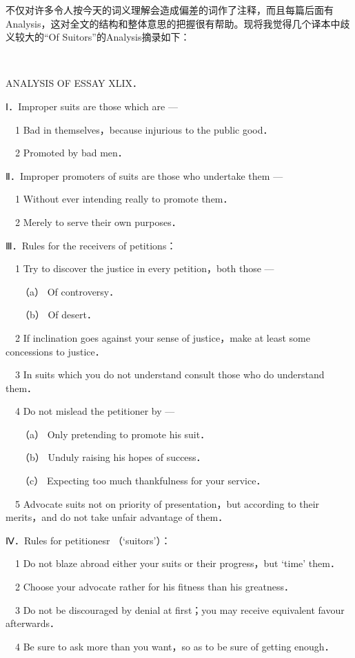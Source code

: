 \par 不仅对许多令人按今天的词义理解会造成偏差的词作了注释，而且每篇后面有Analysis，这对全文的结构和整体意思的把握很有帮助。现将我觉得几个译本中歧义较大的“Of Suitors”的Analysis摘录如下：
\par  
\par ANALYSIS OF ESSAY XLIX．
\par Ⅰ．Improper suits are those which are —
\par 　1 Bad in themselves，because injurious to the public good．
\par 　2 Promoted by bad men．
\par Ⅱ．Improper promoters of suits are those who undertake them —
\par 　1 Without ever intending really to promote them．
\par 　2 Merely to serve their own purposes．
\par Ⅲ．Rules for the receivers of petitions：
\par 　1 Try to discover the justice in every petition，both those —
\par 　　（a） Of controversy．
\par 　　（b） Of desert．
\par 　2 If inclination goes against your sense of justice，make at least some concessions to justice．
\par 　3 In suits which you do not understand consult those who do understand them．
\par 　4 Do not mislead the petitioner by —
\par 　　（a） Only pretending to promote his suit．
\par 　　（b） Unduly raising his hopes of success．
\par 　　（c） Expecting too much thankfulness for your service．
\par 　5 Advocate suits not on priority of presentation，but according to their merits，and do not take unfair advantage of them．
\par Ⅳ．Rules for petitionesr （‘suitors’）：
\par 　1 Do not blaze abroad either your suits or their progress，but ‘time’ them．
\par 　2 Choose your advocate rather for his fitness than his greatness．
\par 　3 Do not be discouraged by denial at first；you may receive equivalent favour afterwards．
\par 　4 Be sure to ask more than you want，so as to be sure of getting enough．
